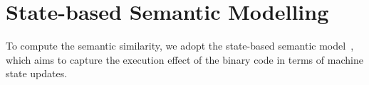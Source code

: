 %


\section{State-based Semantic Modelling} \label{subsec:stat_sem}
To compute the semantic similarity, we adopt the state-based semantic model~\cite{luo2014semantics,DBLP:conf/sp/PewnyGGRH15}, which aims to capture the execution effect of the binary code in terms of machine state updates.

